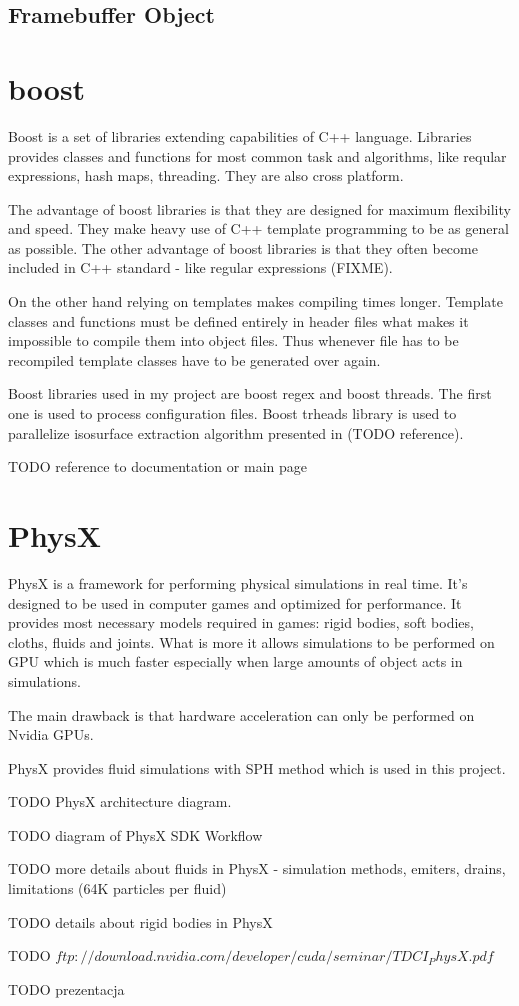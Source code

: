 \subsection{Framebuffer Object}

\section{boost}
Boost is a set of libraries extending capabilities of C++ language. Libraries provides classes and functions for most common task and algorithms, like reqular expressions, hash maps, threading. They are also cross platform. 

The advantage of boost libraries is that they are designed for maximum flexibility and speed. They make heavy use of C++ template programming to be as general as possible. The other advantage of boost libraries is that they often become included in C++ standard - like regular expressions (FIXME). 

On the other hand relying on templates makes compiling times longer. Template classes and functions must be defined entirely in header files what makes it impossible to compile them into object files. Thus whenever file has to be recompiled template classes have to be generated over again.

Boost libraries used in my project are boost regex and boost threads. The first one is used to process configuration files. Boost trheads library is used to parallelize isosurface extraction algorithm presented in (TODO reference).

TODO reference to documentation or main page

\section{PhysX}

PhysX is a framework for performing physical simulations in real time. It's designed to be used in computer games and optimized for performance. It provides most necessary models required in games: rigid bodies, soft bodies, cloths, fluids and joints. What is more it allows simulations to be performed on GPU which is much faster especially when large amounts of object acts in simulations.

The main drawback is that hardware acceleration can only be performed on Nvidia GPUs. 

PhysX provides fluid simulations with SPH method which is used in this project. 

TODO PhysX architecture diagram.

TODO diagram of PhysX SDK Workflow

TODO more details about fluids in PhysX - simulation methods, emiters, drains, limitations (64K particles per fluid)

TODO details about rigid bodies in PhysX

TODO $ftp://download.nvidia.com/developer/cuda/seminar/TDCI_PhysX.pdf$

TODO prezentacja



